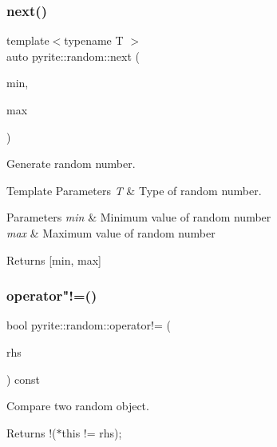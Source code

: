 \subsubsection{\texorpdfstring{next()}{next()}\hspace{0.1cm}{\footnotesize\ttfamily [2/2]}}
{\footnotesize\ttfamily template$<$typename T $>$ \\
auto pyrite\+::random\+::next (\begin{DoxyParamCaption}\item[{T const \&}]{min,  }\item[{T const \&}]{max }\end{DoxyParamCaption})}

Generate random number.


\begin{DoxyTemplParams}{Template Parameters}
{\em T} & Type of random number. \\
\hline
\end{DoxyTemplParams}

\begin{DoxyParams}{Parameters}
{\em min} & Minimum value of random number \\
\hline
{\em max} & Maximum value of random number\\
\hline
\end{DoxyParams}
\begin{DoxyReturn}{Returns}
\mbox{[}min, max\mbox{]} 
\end{DoxyReturn}
\mbox{\label{classpyrite_1_1random_aaef2fad3aa9ae947e7ed640db176373e}} 
\subsubsection{\texorpdfstring{operator"!=()}{operator!=()}}
{\footnotesize\ttfamily bool pyrite\+::random\+::operator!= (\begin{DoxyParamCaption}\item[{\mbox{\hyperlink{classpyrite_1_1random}{random}} const \&}]{rhs }\end{DoxyParamCaption}) const\hspace{0.3cm}{\ttfamily [noexcept]}}

Compare two random object.

\begin{DoxyReturn}{Returns}
!($\ast$this != rhs); 
\end{DoxyReturn}
\mbox{\label{classpyrite_1_1random_a3cd7cfec2938a1bd9541f34bf2b7ac77}} 
